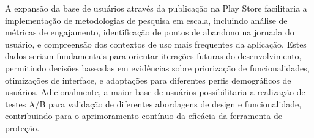 A expansão da base de usuários através da publicação na Play Store facilitaria a implementação de metodologias de pesquisa em escala, incluindo análise de métricas de engajamento, identificação de pontos de abandono na jornada do usuário, e compreensão dos contextos de uso mais frequentes da aplicação. Estes dados seriam fundamentais para orientar iterações futuras do desenvolvimento, permitindo decisões baseadas em evidências sobre priorização de funcionalidades, otimizações de interface, e adaptações para diferentes perfis demográficos de usuários. Adicionalmente, a maior base de usuários possibilitaria a realização de testes A/B para validação de diferentes abordagens de design e funcionalidade, contribuindo para o aprimoramento contínuo da eficácia da ferramenta de proteção.
\begin{comment}
A realização de estudos empíricos mais extensivos com usuários finais também representaria uma vertente importante para trabalhos futuros, incluindo testes de usabilidade em condições simuladas de estresse, avaliações de acessibilidade com usuários com diferentes tipos de deficiência, e estudos longitudinais para avaliar a eficácia real da aplicação em contextos de uso prolongado. Adicionalmente, seria relevante investigar a integração com órgãos públicos de segurança e organizações de proteção às mulheres, criando canais diretos para encaminhamento de alertas quando apropriado e em conformidade com as preferências e consentimento dos usuários.
\end{comment}